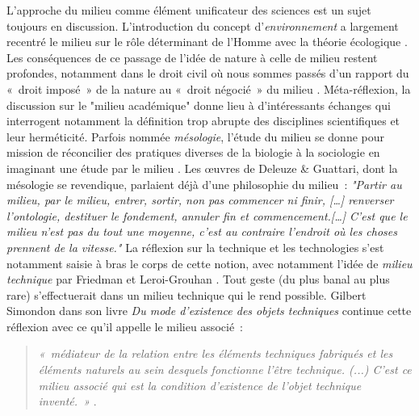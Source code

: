 L’approche du milieu comme élément unificateur des sciences est un sujet toujours en discussion. L’introduction du concept d’\textit{environnement} a largement recentré le milieu sur le rôle déterminant de l’Homme avec  la théorie écologique \citep{Gandolfo2008}. Les conséquences de ce passage de l’idée de nature à celle de milieu restent profondes, notamment dans le droit civil où nous sommes passés d’un rapport du « droit imposé » de la nature au « droit négocié » du milieu \citep{Papaux2008}. Méta-réflexion, la discussion sur le "milieu académique" donne lieu à d’intéressants échanges \citep{Stengers2009} qui interrogent notamment la définition trop abrupte des disciplines scientifiques et leur herméticité. Parfois nommée \textit{mésologie}, l’étude du milieu se donne pour mission de réconcilier des pratiques diverses de la biologie à la sociologie en imaginant une étude par le milieu \citep{Stengers2003}. Les œuvres de Deleuze \& Guattari, dont la mésologie se revendique, parlaient déjà d’une philosophie du milieu : \textit{"Partir au milieu, par le milieu, entrer, sortir, non pas commencer ni finir, […] renverser l'ontologie, destituer le fondement, annuler fin et commencement.[…] C'est que le milieu n'est pas du tout une moyenne, c'est au contraire l'endroit où les choses prennent de la vitesse."} \citep{Deleuze1972} 
La réflexion sur la technique et les technologies s’est notamment saisie à bras le corps de cette notion, avec notamment l’idée de \textit{milieu technique} par Friedman et Leroi-Grouhan \citep{Stiegler1998}. Tout geste (du plus banal au plus rare) s’effectuerait dans un milieu technique qui le rend possible. Gilbert Simondon dans son livre \textit{Du mode d’existence des objets techniques} continue cette réflexion avec ce qu’il appelle le milieu associé : 

\begin{quote}
    \textit{« médiateur de la relation entre les éléments techniques fabriqués et les éléments  naturels au sein desquels fonctionne l’être technique. (...) C’est ce milieu associé    qui est la condition d’existence de l’objet technique inventé. »} \citep{Simondon1989}. 
\end{quote}

